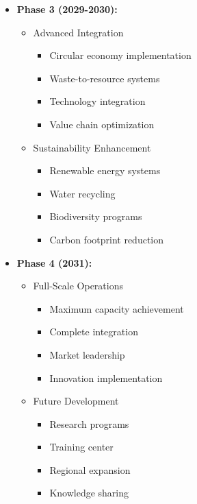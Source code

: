 \begin{itemize}
    \item \textbf{Phase 3 (2029-2030):}
    \begin{itemize}
        \item Advanced Integration
        \begin{itemize}
            \item Circular economy implementation
            \item Waste-to-resource systems
            \item Technology integration
            \item Value chain optimization
        \end{itemize}
        
        \item Sustainability Enhancement
        \begin{itemize}
            \item Renewable energy systems
            \item Water recycling
            \item Biodiversity programs
            \item Carbon footprint reduction
        \end{itemize}
    \end{itemize}
    
    \item \textbf{Phase 4 (2031):}
    \begin{itemize}
        \item Full-Scale Operations
        \begin{itemize}
            \item Maximum capacity achievement
            \item Complete integration
            \item Market leadership
            \item Innovation implementation
        \end{itemize}
        
        \item Future Development
        \begin{itemize}
            \item Research programs
            \item Training center
            \item Regional expansion
            \item Knowledge sharing
        \end{itemize}
    \end{itemize}
\end{itemize}

